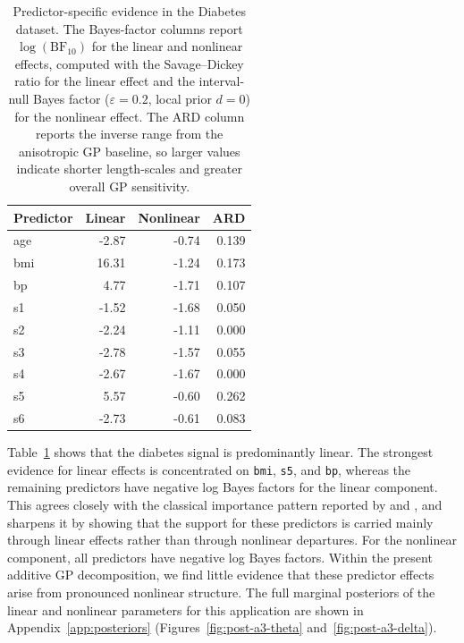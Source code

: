 \documentclass{article}
\begin{document}
\begin{table}[t]
  \centering
  \caption{Predictor-specific evidence in the Diabetes dataset. The Bayes-factor columns report $\log(\mathrm{BF}_{10})$ for the linear and nonlinear effects, computed with the Savage--Dickey ratio for the linear effect and the interval-null Bayes factor ($\varepsilon=0.2$, local prior $d=0$) for the nonlinear effect. The ARD column reports the inverse range from the anisotropic GP baseline, so larger values indicate shorter length-scales and greater overall GP sensitivity.}
  \label{tab:diabetes_bf_ard}
  \small
  \begin{tabular}{lrrr}
    \toprule
    Predictor & Linear & Nonlinear & ARD \\
    \midrule
    age & -2.87 & -0.74 & 0.139 \\
    bmi & 16.31 & -1.24 & 0.173 \\
    bp  & 4.77  & -1.71 & 0.107 \\
    s1  & -1.52 & -1.68 & 0.050 \\
    s2  & -2.24 & -1.11 & 0.000 \\
    s3  & -2.78 & -1.57 & 0.055 \\
    s4  & -2.67 & -1.67 & 0.000 \\
    s5  & 5.57  & -0.60 & 0.262 \\
    s6  & -2.73 & -0.61 & 0.083 \\
    \bottomrule
  \end{tabular}
\end{table}

Table~\ref{tab:diabetes_bf_ard} shows that the diabetes signal is predominantly linear. The strongest evidence for linear effects is concentrated on \texttt{bmi}, \texttt{s5}, and \texttt{bp}, whereas the remaining predictors have negative log Bayes factors for the linear component. This agrees closely with the classical importance pattern reported by \textcite{efron2004} and \textcite{park2008bayesian}, and sharpens it by showing that the support for these predictors is carried mainly through linear effects rather than through nonlinear departures. For the nonlinear component, all predictors have negative log Bayes factors. Within the present additive GP decomposition, we find little evidence that these predictor effects arise from pronounced nonlinear structure. The full marginal posteriors of the linear and nonlinear parameters for this application are shown in Appendix~\ref{app:posteriors} (Figures~\ref{fig:post-a3-theta} and~\ref{fig:post-a3-delta}).
\end{document}

